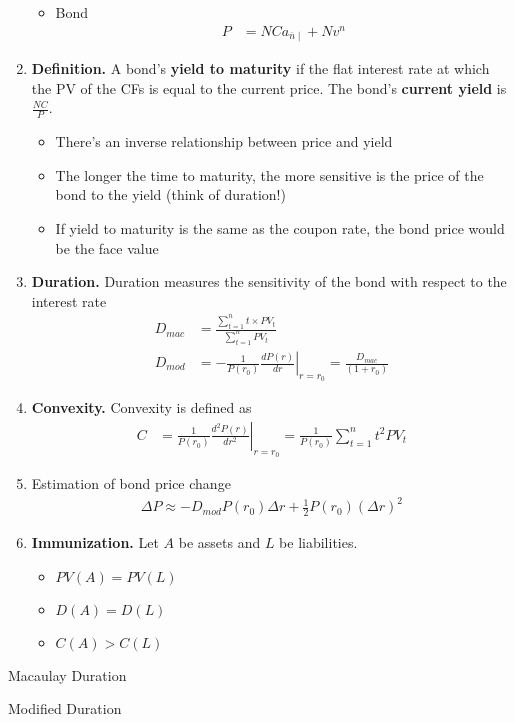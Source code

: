 \documentclass[12pt,twoside]{article}
\begin{document}
\begin{enumerate}
\begin{itemize}
			\item Bond
				\begin{align*}
					P & = NCa_{\overline{n}\mid} + Nv^n
				\end{align*}
		\end{itemize}

	\item \textbf{Definition.} A bond's \textbf{yield to maturity} if the flat interest rate at which the PV of the CFs is equal to the current price. The bond's \textbf{current yield} is $\frac{NC}{P}$.
		\begin{itemize}
			\item There's an inverse relationship between price and yield
			\item The longer the time to maturity, the more sensitive is the price of the bond to the yield (think of duration!)
			\item If yield to maturity is the same as the coupon rate, the bond price would be the face value
		\end{itemize}
		
	\item \textbf{Duration.} Duration measures the sensitivity of the bond with respect to the interest rate
		\begin{align*}
			D_{mac}& = \frac{\sum_{t=1}^n t\times PV_t }{\sum_{t=1}^n PV_t}\\
			D_{mod}& = -\frac{1}{P(r_0)}\left.\frac{dP(r)}{dr}\right\vert_{r=r_0} = \frac{D_{mac}}{(1+r_0)}
		\end{align*}
		
	\item \textbf{Convexity.} Convexity is defined as
		\begin{align*}
			C	&=\frac{1}{P(r_0)}\left.\frac{d^2P(r)}{dr^2}\right\vert_{r=r_0}
				=\frac{1}{P(r_0)}\sum_{t=1}^n t^2PV_t
		\end{align*}
	
	\item Estimation of bond price change
		\begin{align*}
			\Delta P \approx -D_{mod}P(r_0)\Delta r + \frac{1}{2}P(r_0) (\Delta r)^2
		\end{align*}

	\item \textbf{Immunization.} Let $A$ be assets and $L$ be liabilities.
		\begin{itemize}
			\item $PV(A) = PV(L)$
			\item $D(A) = D(L)$
			\item $C(A) > C(L)$
		\end{itemize}

\end{enumerate}




Macaulay Duration


Modified Duration
\end{document}
